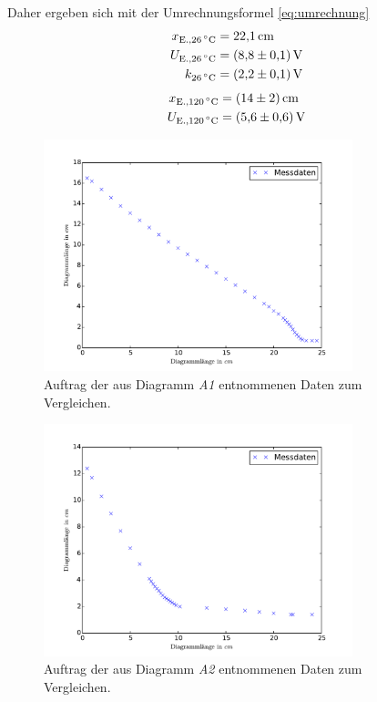 Daher ergeben sich mit der Umrechnungsformel \eqref{eq:umrechnung}
\begin{align}
	x_\text{E.,\SI{26}{\degreeCelsius}}&= \SI{22.1}{\centi\meter}\\
	U_\text{E.,\SI{26}{\degreeCelsius}}&= \SI{8.8(1)}{\volt}\\
	k_\text{\SI{26}{\degreeCelsius}} &= \SI{2.2(1)}{\volt}
	\label{qu:k1}
\end{align}
\begin{align}
	x_\text{E.,\SI{120}{\degreeCelsius}}&= \SI{14(2)}{\centi\meter}\\
	U_\text{E.,\SI{120}{\degreeCelsius}}&= \SI{5.6(6)}{\volt}\\
\end{align}
\newpage
\begin{figure}[p!]
	\centering
	\includegraphics[width=0.8\textwidth]{Bilder/Vert_kalt.pdf}
	\caption{Auftrag der aus Diagramm \emph{A1} entnommenen Daten zum Vergleichen.\cite{matplotlib}}
	\label{fig:E_vert_kalt}
\end{figure}
\begin{figure}[p!]
	\centering
	\includegraphics[width=0.8\textwidth]{Bilder/Vert_warm.pdf}
	\caption{Auftrag der aus Diagramm \emph{A2} entnommenen Daten zum Vergleichen.\cite{matplotlib}}
	\label{fig:E_vert_warm}
\end{figure}
